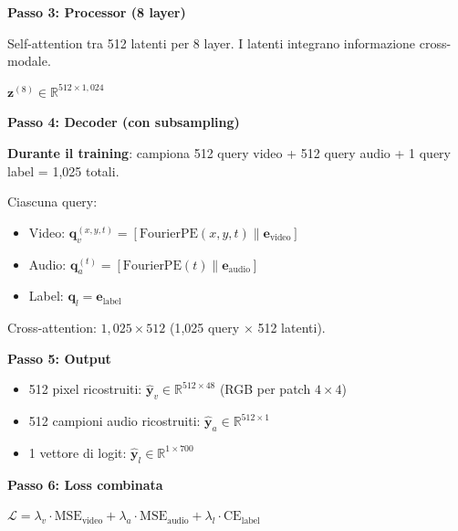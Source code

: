 \documentclass[12pt,a4paper]{article}
\begin{document}
\begin{examplebox}
\textbf{Passo 3: Processor (8 layer)}

Self-attention tra 512 latenti per 8 layer. I latenti integrano informazione cross-modale.

$\mathbf{z}^{(8)} \in \mathbb{R}^{512 \times 1{,}024}$

\textbf{Passo 4: Decoder (con subsampling)}

\textbf{Durante il training}: campiona 512 query video + 512 query audio + 1 query label = 1{,}025 totali.

Ciascuna query:
\begin{itemize}
    \item Video: $\mathbf{q}_v^{(x,y,t)} = [\text{FourierPE}(x, y, t) \| \mathbf{e}_{\text{video}}]$
    \item Audio: $\mathbf{q}_a^{(t)} = [\text{FourierPE}(t) \| \mathbf{e}_{\text{audio}}]$
    \item Label: $\mathbf{q}_l = \mathbf{e}_{\text{label}}$
\end{itemize}

Cross-attention: $1{,}025 \times 512$ (1{,}025 query $\times$ 512 latenti).

\textbf{Passo 5: Output}
\begin{itemize}
    \item 512 pixel ricostruiti: $\hat{\mathbf{y}}_v \in \mathbb{R}^{512 \times 48}$ (RGB per patch $4 \times 4$)
    \item 512 campioni audio ricostruiti: $\hat{\mathbf{y}}_a \in \mathbb{R}^{512 \times 1}$
    \item 1 vettore di logit: $\hat{\mathbf{y}}_l \in \mathbb{R}^{1 \times 700}$
\end{itemize}

\textbf{Passo 6: Loss combinata}

$\mathcal{L} = \lambda_v \cdot \text{MSE}_{\text{video}} + \lambda_a \cdot \text{MSE}_{\text{audio}} + \lambda_l \cdot \text{CE}_{\text{label}}$
\end{examplebox}
\end{document}
